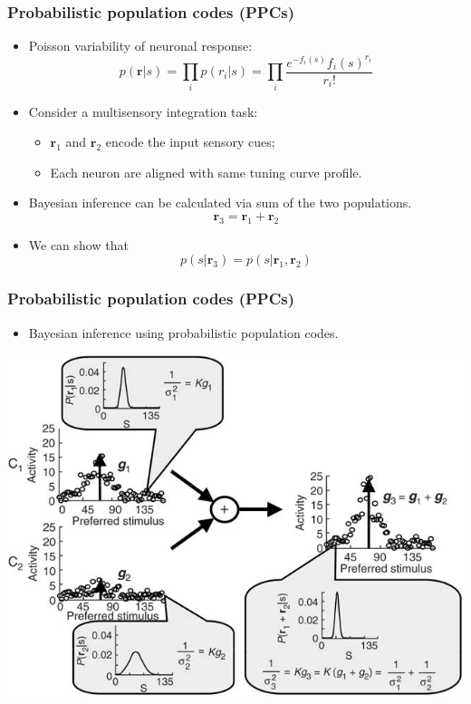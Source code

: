 \documentclass{beamer}
\begin{document}
\begin{frame}
  \frametitle{Probabilistic population codes (PPCs) \cite{ma_bayesian_2006}}
  \begin{itemize}
    \item Poisson variability of neuronal response:
\begin{equation}
  p(\mathbf{r}|s) = \prod_{i} p(r_i|s) = \prod_{i} \frac{e^{-f_i(s)} f_i(s)^{r_i}}{r_i!}
  \label{eq:popvar}
\end{equation}
    \item Consider a multisensory integration task:
    \begin{itemize}
      \item $\mathbf{r}_1$ and $\mathbf{r}_2$ encode the input sensory cues;
      \item Each neuron are aligned with same tuning curve profile.
    \end{itemize}
    \item Bayesian inference can be calculated via sum of the two populations.
    \begin{equation} \mathbf{r}_3 = \mathbf{r}_1 + \mathbf{r}_2 \end{equation}
    \item We can show that
    \begin{equation} p(s|\mathbf{r}_3) = p(s|\mathbf{r}_1,\mathbf{r}_2) \end{equation}
  \end{itemize}
\end{frame}

\begin{frame}
  \frametitle{Probabilistic population codes (PPCs) \cite{ma_bayesian_2006}}
  \begin{itemize}
    \item Bayesian inference using probabilistic population codes.
  \end{itemize}
  \begin{center}
    \includegraphics[width=.8\textwidth]{infer}
  \end{center}
\end{frame}
\end{document}
